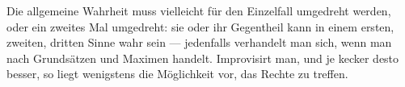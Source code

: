 Die allgemeine Wahrheit muss vielleicht für den Einzelfall umgedreht werden, oder ein zweites Mal umgedreht: sie oder ihr Gegentheil kann in einem ersten, zweiten, dritten Sinne  wahr sein — jedenfalls verhandelt man sich, wenn man nach Grundsätzen und Maximen handelt. Improvisirt man, und je kecker desto besser, so liegt wenigstens die Möglichkeit vor, das Rechte zu treffen.
\par


